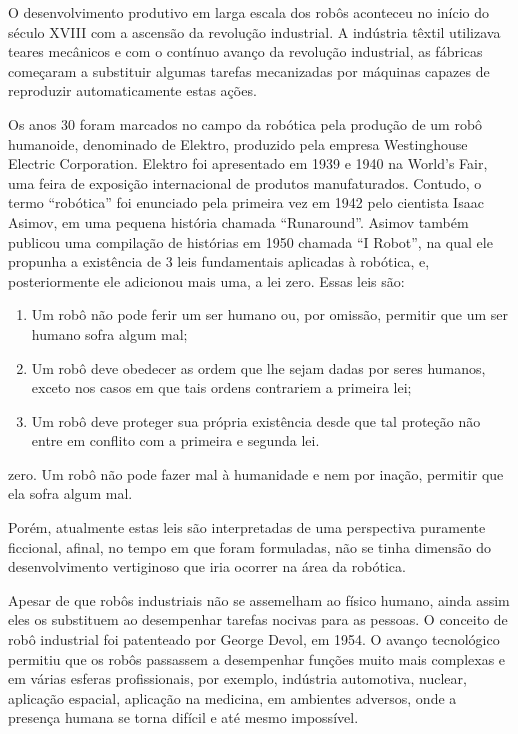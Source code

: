 O desenvolvimento produtivo em larga escala dos robôs aconteceu no início do século XVIII com a ascensão da revolução industrial. A indústria têxtil utilizava teares mecânicos e com o contínuo avanço da revolução industrial, as fábricas começaram a substituir algumas tarefas mecanizadas por máquinas capazes de reproduzir automaticamente estas ações.
  
Os anos 30 foram marcados no campo da robótica pela produção de um robô humanoide, denominado de Elektro, produzido pela empresa Westinghouse Electric Corporation. Elektro foi apresentado em 1939 e 1940 na World’s Fair,  uma feira de exposição internacional de produtos manufaturados. Contudo, o termo “robótica” foi enunciado pela primeira vez em 1942 pelo cientista Isaac Asimov, em uma pequena história chamada “Runaround”. Asimov também publicou uma compilação de histórias em 1950 chamada “I Robot”, na qual ele propunha a existência de 3 leis fundamentais aplicadas à robótica, e, posteriormente ele adicionou mais uma, a lei zero. Essas leis são:

\begin{enumerate}
	\item Um robô não pode ferir um ser humano ou, por omissão, permitir que um ser humano sofra algum mal;
	\item Um robô deve obedecer as ordem que lhe sejam dadas por seres humanos, exceto nos casos em que tais ordens contrariem a primeira lei;
	\item Um robô deve proteger sua própria existência desde que tal proteção não entre em conflito com a primeira e segunda lei.
\end{enumerate}

zero.     Um robô não pode fazer mal à humanidade e nem por inação, permitir que ela sofra algum mal.

Porém, atualmente estas leis são interpretadas de uma perspectiva puramente ficcional, afinal, no tempo em que foram formuladas, não se tinha dimensão do desenvolvimento vertiginoso que iria ocorrer na área da robótica.

Apesar de que robôs industriais não se assemelham ao físico humano, ainda assim eles os substituem ao desempenhar tarefas nocivas para as pessoas. O conceito de robô industrial foi patenteado por George Devol, em 1954. O avanço tecnológico permitiu que os robôs passassem a desempenhar funções muito mais complexas e em várias esferas profissionais, por exemplo, indústria automotiva, nuclear, aplicação espacial, aplicação na medicina, em  ambientes adversos, onde a presença humana se torna difícil e até mesmo impossível.


